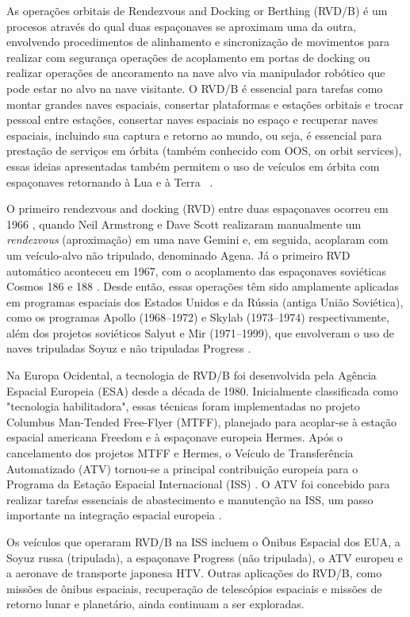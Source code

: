 As operações orbitais de Rendezvous and Docking or Berthing (RVD/B) é um procesos através do qual duas espaçonaves se aproximam uma da outra, envolvendo procedimentos de alinhamento e sincronização de movimentos para realizar com segurança operações de acoplamento em portas de docking ou realizar operações de ancoramento na nave alvo via manipulador robótico que pode estar no alvo na nave visitante. O RVD/B é essencial para tarefas como montar grandes naves espaciais, consertar plataformas e estações orbitais e trocar pessoal entre estações, consertar naves espaciais no espaço e recuperar naves espaciais, incluindo sua captura e retorno ao mundo, ou seja, é essencial para prestação de serviços em órbita (também conhecido com OOS, on orbit services), essas ideias apresentadas também permitem o uso de veículos em órbita com espaçonaves retornando à Lua e à Terra \ \cite{fehse2003}.

O primeiro rendezvous and docking (RVD) entre duas espaçonaves ocorreu em 1966 \cite{nasa1stDocking}, quando Neil Armstrong e Dave Scott realizaram manualmente um \textit{rendezvous} (aproximação) em uma nave Gemini e, em seguida, acoplaram com um veículo-alvo não tripulado, denominado Agena. Já o primeiro RVD automático aconteceu em 1967, com o acoplamento das espaçonaves soviéticas Cosmos 186 e 188 \cite{fehse2003}. Desde então, essas operações têm sido amplamente aplicadas em programas espaciais dos Estados Unidos e da Rússia (antiga União Soviética), como os programas Apollo (1968–1972) e Skylab (1973–1974) respectivamente, além dos projetos soviéticos Salyut e Mir (1971–1999), que envolveram o uso de naves tripuladas Soyuz e não tripuladas Progress \cite{fehse2003}.

Na Europa Ocidental, a tecnologia de RVD/B foi desenvolvida pela Agência Espacial Europeia (ESA) desde a década de 1980. Inicialmente classificada como "tecnologia habilitadora", essas técnicas foram implementadas no projeto Columbus Man-Tended Free-Flyer (MTFF), planejado para acoplar-se à estação espacial americana Freedom \cite{goelz1992MtffFreedom} e à espaçonave europeia Hermes. Após o cancelamento dos projetos MTFF e Hermes, o Veículo de Transferência Automatizado (ATV) tornou-se a principal contribuição europeia para o Programa da Estação Espacial Internacional (ISS) \cite{ellwood2007ATV2ISS}. O ATV foi concebido para realizar tarefas essenciais de abastecimento e manutenção na ISS, um passo importante na integração espacial europeia \cite{fehse2003}.

Os veículos que operaram RVD/B na ISS incluem o Ônibus Espacial dos EUA, a Soyuz russa (tripulada), a espaçonave Progress (não tripulada), o ATV europeu e a aeronave de transporte japonesa HTV. Outras aplicações do RVD/B, como missões de ônibus espaciais, recuperação de telescópios espaciais e missões de retorno lunar e planetário, ainda continuam a ser exploradas.

